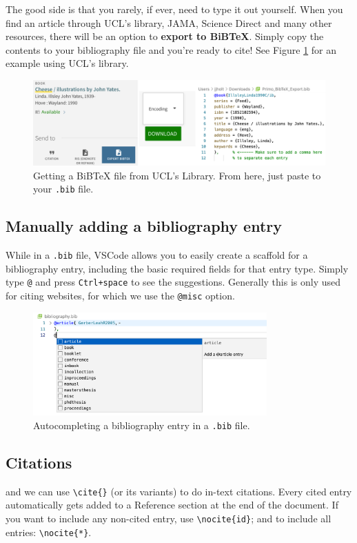 The good side is that you rarely, if ever, need to type it out yourself.
When you find an article through UCL's library, JAMA, Science Direct and many other resources, there will be an option to \textbf{export to BiBTeX}.
Simply copy the contents to your bibliography file and you're ready to cite!
See Figure \ref{fig:ucl-lib} for an example using UCL's library.
\clearpage
\begin{figure}[h]
  \centering
  \includegraphics[width=\textwidth]{figures/ucl-lib.png}
  \caption{Getting a BiBTeX file from UCL's Library. From here, just paste to your \texttt{.bib} file.}
  \label{fig:ucl-lib}
\end{figure}

\subsection{Manually adding a bibliography entry}
While in a \verb|.bib| file, VSCode allows you to easily create a scaffold for a bibliography entry, including the basic required fields for that entry type.
Simply type \verb|@| and press \verb|Ctrl+space| to see the suggestions.
Generally this is only used for citing websites, for which we use the \verb|@misc| option.
\begin{figure}[h]
  \centering
    \includegraphics[width=0.8\textwidth]{figures/bib-entry.png}
  \caption{Autocompleting a bibliography entry in a \texttt{.bib} file.}
  \label{fig:bib-entry}
\end{figure}

\subsection{Citations}
and we can use \verb|\cite{}| (or its variants) to do in-text citations.
Every cited entry automatically gets added to a Reference section at the end of the document.
If you want to include any non-cited entry, use \verb|\nocite{id}|; and to include all entries: \verb|\nocite{*}|.
\clearpage


